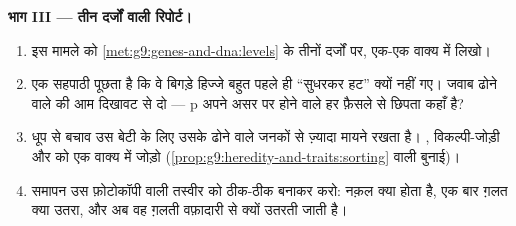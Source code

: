 \begin{problem}[{सप्ताहांत समस्या --- एक जीन का, हिज्जों से वंश-वृक्ष तक
पीछा}]
\medskip\noindent\textbf{भाग III --- तीन दर्जों वाली रिपोर्ट।}
\begin{enumerate}[resume]
  \item इस मामले को \cref{met:g9:genes-and-dna:levels} के तीनों
        दर्जों पर, एक-एक वाक्य में लिखो।
  \item एक सहपाठी पूछता है कि वे बिगड़े हिज्जे बहुत पहले ही ``सुधरकर
        हट'' क्यों नहीं गए। जवाब ढोने वाले की आम दिखावट से दो --- p
        अपने असर पर होने वाले हर फ़ैसले से छिपता कहाँ है?
  \item धूप से बचाव उस बेटी के लिए उसके ढोने वाले जनकों से ज़्यादा
        मायने रखता है। , विकल्पी-जोड़ी और  को एक वाक्य
        में जोड़ो (\cref{prop:g9:heredity-and-traits:sorting} वाली
        बुनाई)।
  \item समापन उस फ़ोटोकॉपी वाली तस्वीर को ठीक-ठीक बनाकर करो: नक़ल क्या
        होता है, एक बार ग़लत क्या उतरा, और अब वह ग़लती वफ़ादारी से
        क्यों उतरती जाती है।
\end{enumerate}
\end{problem}
